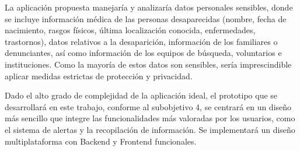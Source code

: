     La aplicación propuesta manejaría y analizaría datos personales sensibles, donde se incluye información médica de las personas desaparecidas (nombre, fecha de nacimiento, rasgos físicos, última localización conocida, enfermedades, trastornos), datos relativos a la desaparición, información de los familiares o denunciantes, así como información de los equipos de búsqueda, voluntarios e instituciones. Como la mayoría de estos datos son sensibles, sería imprescindible aplicar medidas estrictas de protección y privacidad.

    Dado el alto grado de complejidad de la aplicación ideal, el prototipo que se desarrollará en este trabajo, conforme al subobjetivo 4, se centrará en un diseño más sencillo que integre las funcionalidades más valoradas por los usuarios, como el sistema de alertas y la recopilación de información. Se implementará un diseño multiplataforma con Backend y Frontend funcionales. 
